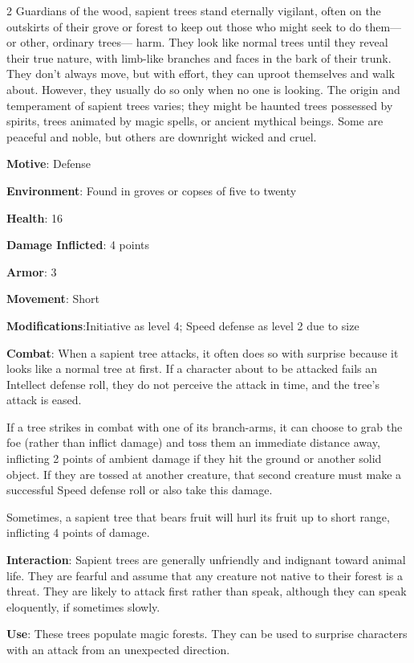 \begin{multicols}{2}
Guardians of the wood, sapient trees stand eternally vigilant, often on the outskirts of their grove or forest to keep out those who might seek to do them—or other, ordinary trees— harm. They look like normal trees until they reveal their true nature, with limb-like branches and faces in the bark of their trunk. They don’t always move, but with effort, they can uproot themselves and walk about. However, they usually do so only when no one is looking. The origin and temperament of sapient trees varies; they might be haunted trees possessed by spirits, trees animated by magic spells, or ancient mythical beings. Some are peaceful and noble, but others are downright wicked and cruel. 

\textbf{Motive}: Defense 

\textbf{Environment}: Found in groves or copses of five to twenty 

\textbf{Health}: 16 

\textbf{Damage Inflicted}: 4 points 

\textbf{Armor}: 3 

\textbf{Movement}: Short 

\textbf{Modifications}:Initiative as level 4; Speed defense as level 2 due to size 

\textbf{Combat}: When a sapient tree attacks, it often does so with surprise because it looks like a normal tree at first. If a character about to be attacked fails an Intellect defense roll, they do not perceive the attack in time, and the tree’s attack is eased. 

If a tree strikes in combat with one of its branch-arms, it can choose to grab the foe (rather than inflict damage) and toss them an immediate distance away, inflicting 2 points of ambient damage if they hit the ground or another solid object. If they are tossed at another creature, that second creature must make a successful Speed defense roll or also take this damage. 

Sometimes, a sapient tree that bears fruit will hurl its fruit up to short range, inflicting 4 points of damage. 

\textbf{Interaction}: Sapient trees are generally unfriendly and indignant toward animal life. They are fearful and assume that any creature not native to their forest is a threat. They are likely to attack first rather than speak, although they can speak eloquently, if sometimes slowly. 

\textbf{Use}: These trees populate magic forests. They can be used to surprise characters with an attack from an unexpected direction.


\end{multicols}
